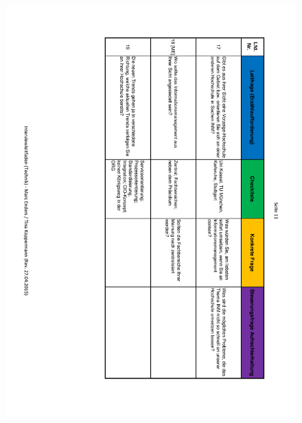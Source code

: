 \begin{figure}
	\centering
	\includegraphics[width=18cm]{kapitel/anhang/Interviewleitfaden_11}
\end{figure}

